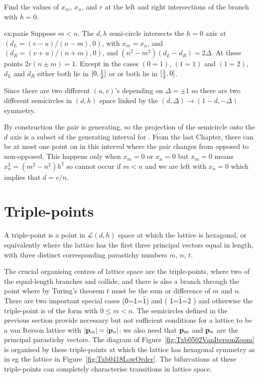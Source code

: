 \begin{jExercise}\label{ex:paxis}
	Find the values of $x_m$, $x_n$, and $r$ at the left and right
	intersections of the  branch with $h=0$.
\end{jExercise}
\begin{jAnswer}{ex:paxis}{
	Suppose $m<n$. The $d,h$ semi-circle intersects the $h=0$ axis 
	at $(d_L= (v-u)/(n-m),0)$, with $x_m=x_n$, and $(d_R=(v+u)/(n+m),0)$, 
	and $(n^2-m^2)(d_L-d_R) = 2\Delta$. 
	At these points $2r(n\pm m)=1$.
Except in the cases $(0=1)$, $(1=1)$ and $(1=2)$,  $d_L$ and $d_R$ either both lie in $[0,\textstyle{\frac{1}{2}}]$ or or both lie in $[\textstyle{\frac{1}{2}},0]$.
}\end{jAnswer}



Since there are two different $(u,v)$'s depending on $\Delta=\pm 1$ so there are two different semicircles in $(d,h)$ space linked by the $(d,\Delta)\rightarrow(1-d,-\Delta)$ symmetry.

By construction the pair is generating, so the projection of the semicircle onto the $d$ axis is a subset of the generating interval for . From the last Chapter, there can be at most one point on in this interval where the pair changes from opposed to non-opposed. This happens only when $x_m=0$ or $x_n=0$ but
$x_m=0$ means $x_n^2=(m^2-n^2)h^2$ so cannot occur if $m<n$  and we are left with $x_n=0$ which implies that $d=v/n$. 


\section{Triple-points}
\label{sec:triplep}
\begin{definition}
	A {triple-point}  is a point in $\mathcal{L}(d,h)$ space at which the lattice is hexagonal, or equivalently where the lattice has the first three  principal vectors equal in length, with three distinct corresponding parastichy numbers $m$, $n$, $t$. 
\end{definition}
The crucial organising centres of lattice space are the triple-points, where two of the equal-length branches  and  collide, and there is also a branch  through the point where by Turing's theorem $t$ must be the sum or difference of $m$ and $n$. There are two important special cases
\textsf{	 (\ensuremath{\textsf{0=1=}\hat{\textsf{1}}})}
  and 
\textsf{   (
\ensuremath{ 
	\textsf{1=}
	\hat{\textsf{1}}
	\textsf{=2}}
)}
and otherwise the  triple-point is of the form  with $0\leq m<n$. 
The semicircles defined in the previous section provide necessary but not sufficient conditions for a lattice to be a van Iterson lattice with $|{\mathbf p}_{m}|=|{\mathbf p}_{n}|$: we also need that ${\mathbf p}_{m}$ and ${\mathbf p}_{n}$ are the principal parastichy vectors. 
The diagram of  Figure~\ref{fig:Txb0502VanItersonZoom} is organised by these triple-points  at which the lattice has hexagonal symmetry as in eg the  lattice in Figure~\ref{fig:Txb0418LowOrder}. The bifurcations at these triple-points can completely characterise transitions in lattice space.

